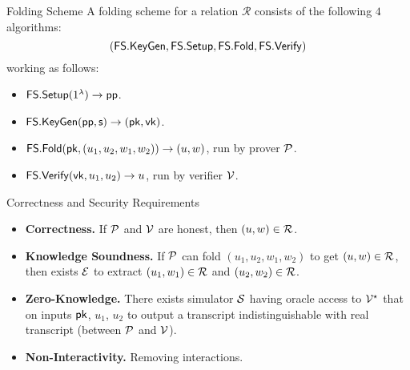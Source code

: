 \begin{frame}{Folding Scheme}
	A folding scheme for a relation $\mathcal{R}$ consists of the following $4$ algorithms:
	\begin{equation*}
		(\mathsf{FS.KeyGen}, \mathsf{FS.Setup}, \mathsf{FS.Fold}, \mathsf{FS.Verify})
	\end{equation*}
	working as follows:
	\begin{itemize}
		\item $\mathsf{FS.Setup}(1^\lambda)\rightarrow\mathsf{pp}$. 
		\item $\mathsf{FS.KeyGen}(\mathsf{pp}, \mathsf{s})\rightarrow(\mathsf{pk}, \mathsf{vk})$.
		\item $\mathsf{FS.Fold}(\mathsf{pk}, (u_1, u_2, w_1, w_2))\rightarrow(u, w)$, run by prover $\mathcal{P}$.
		\item $\mathsf{FS.Verify}(\mathsf{vk}, u_1, u_2)\rightarrow u$, run by verifier $\mathcal{V}$. 
	\end{itemize}
\end{frame}

\begin{frame}{Correctness and Security Requirements}
	\begin{itemize}
		\item \textbf{Correctness.} If $\mathcal{P}$ and $\mathcal{V}$ are honest, then $(u, w) \in \mathcal{R}$.
		\item \textbf{Knowledge Soundness.} If $\mathcal{P}$ can fold $(u_1, u_2, w_1, w_2)$ to get $(u, w) \in \mathcal{R}$, then exists $\mathcal{E}$ to extract  $(u_1, w_1) \in \mathcal{R}$ and $(u_2, w_2) \in \mathcal{R}$.
		\item \textbf{Zero-Knowledge.} There exists simulator $\mathcal{S}$ having oracle access to $\mathcal{V}^\star$ that on inputs $\mathsf{pk}$, $u_1$, $u_2$ to output a transcript indistinguishable with real transcript (between $\mathcal{P}$ and $\mathcal{V}$).
		\item \textbf{Non-Interactivity.} Removing interactions.
	\end{itemize}
\end{frame}